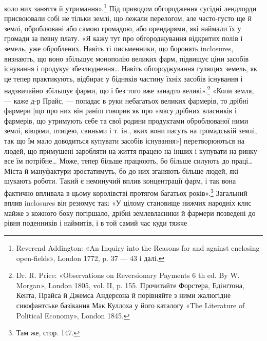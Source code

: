 \parcont{}  %
коло них заняття й утримання».\footnote{
Reverend Addington: «An Inquiry into the Reasons for and against
enclosing open-fields», London 1772, p. 37 — 43 і далі.
} Під приводом обгородження
сусідні лендлорди присвоювали собі не тільки землі, що лежали
перелогом, але часто-густо ще й землі, оброблювані або самою
громадою, або орендарями, які наймали їх у громади за певну
плату. «Я кажу тут про обгороджування відкритих полів і земель,
уже оброблених. Навіть ті письменники, що боронять
inclosures, визнають, що воно збільшує монополію великих
фарм, підвищує ціни засобів існування і продукує збезлюднення\dots{}
Навіть обгороджування гулящих земель, як це тепер практикують,
відбирає у бідняків частину їхніх засобів існування і надзвичайно
збільшує фарми, що і без того вже занадто великі».\footnote{
Dr. R. Price: «Observations on Reversionary Payments 6 th ed.
By W. Morgan», London 1805, vol. II, p. 155. Прочитайте Форстера,
Едінґтона, Кента, Прайса й Джемса Андерсона й порівняйте з ними жалюгідне
сикофантське базікання Мак Куллоха у його каталогу «The
Literature of Political Economy», London 1845.
}
«Коли земля, — каже д-р Прайс, — попадає в руки небагатьох
великих фармерів, то дрібні фармери [що про них він раніш говорив
як про «масу дрібних власників і фармерів, що утримують
себе та свої родини продуктами оброблюваної ними землі, вівцями,
птицею, свиньми і т. ін., яких вони пасуть на громадській
землі, так що їм мало доводиться купувати засобів існування»]
перетворюються на людей, що примушені заробляти на життя
працею на інших і купувати на ринку все їм потрібне\dots{} Може,
тепер більше працюють, бо більше силують до праці\dots{} Міста й
мануфактури зростатимуть, бо до них зганяють більше людей,
які шукають роботи. Такий є неминучий вплив концентрації
фарм, і так вона фактично впливала в цьому королівстві протягом
багатьох років».\footnote{
Там же, стор. 147.
} Загальний вплив inclosures він резюмує
так: «У цілому становище нижчих народніх кляс майже з
кожного боку погіршало, дрібні землевласники й фармери позведені
до рівня поденників і наймитів, і в той самий час куди тяжче
